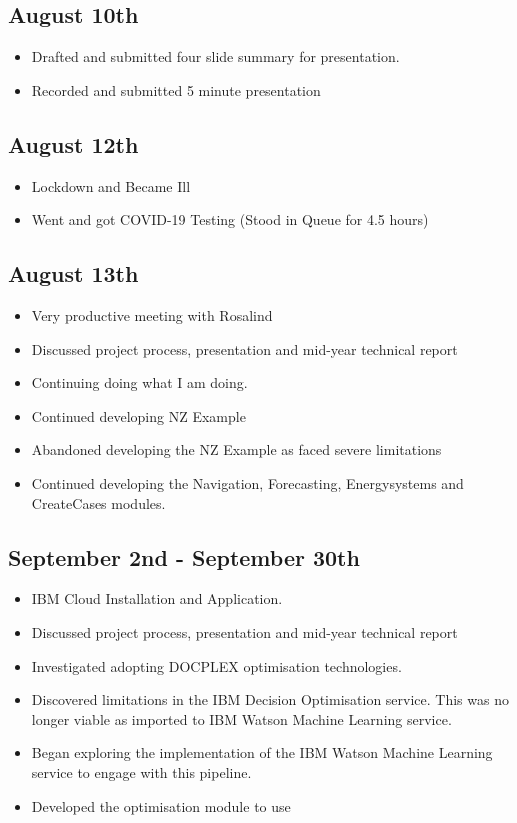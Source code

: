 \documentclass[12pt]{article}
\begin{document}
\subsection{August 10th}
\begin{itemize}
	\item Drafted and submitted four slide summary for presentation.
	\item Recorded and submitted 5 minute presentation
\end{itemize}
\subsection{August 12th}
\begin{itemize}
	\item Lockdown and Became Ill
	\item Went and got COVID-19 Testing (Stood in Queue for 4.5 hours)
\end{itemize}
\subsection{August 13th}
\begin{itemize}
	\item Very productive meeting with Rosalind
	\item Discussed project process, presentation and mid-year technical report
	\item Continuing doing what I am doing.
	\item Continued developing NZ Example
	\item Abandoned developing the NZ Example as faced severe limitations
	\item Continued developing the Navigation, Forecasting, Energysystems and CreateCases modules.
\end{itemize}
\subsection{September 2nd - September 30th}
\begin{itemize}
	\item IBM Cloud Installation and Application.
	\item Discussed project process, presentation and mid-year technical report
	\item Investigated adopting DOCPLEX optimisation technologies.
	\item Discovered limitations in the IBM Decision Optimisation service. This was no longer viable as imported to IBM Watson Machine Learning service.
	\item Began exploring the implementation of the IBM Watson Machine Learning service to engage with this pipeline.
	\item Developed the optimisation module to use
\end{itemize}
\end{document}
